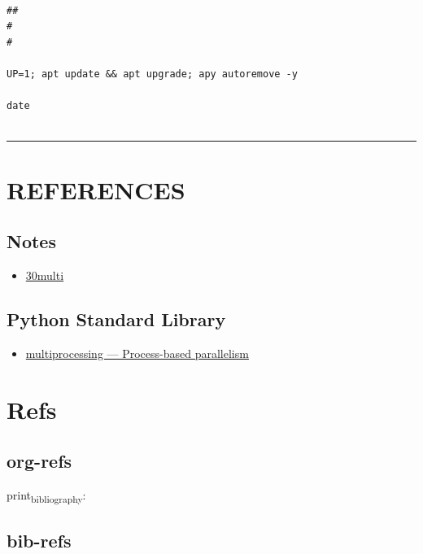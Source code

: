 \documentclass[10pt,a4paper]{article}
\def\xref{../../notes/ref/references}
\def\xref{../../notes/ref/references}
\begin{document}
\begin{verbatim}

##
#
#

UP=1; apt update && apt upgrade; apy autoremove -y

date 


\end{verbatim}


\noindent\rule{\textwidth}{0.5pt}

\section{REFERENCES}
\label{sec:orgdf173c4}
\subsection{Notes}
\label{sec:orgbb4c5e4}
\begin{itemize}
\item \href{../../notes/nat/20241009T171120--30multi\_\_<meta>.org}{30multi}
\end{itemize}
\subsection{Python Standard Library}
\label{sec:orga2b5c6e}
\begin{itemize}
\item \href{https://docs.python.org/3/library/multiprocessing.html}{multiprocessing — Process-based parallelism}
\end{itemize}


\section{Refs}
\label{sec:orgc371288}
\subsection{org-refs}
\label{sec:orgd89b8e2}
print\textsubscript{bibliography}:

\subsection{bib-refs}
\label{sec:orgfb7f8e7}
\nocite{*}


\end{document}
